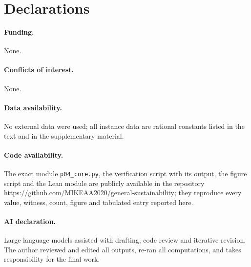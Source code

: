 \section*{Declarations}
\paragraph{Funding.} None.
\paragraph{Conflicts of interest.} None.
\paragraph{Data availability.} No external data were used; all instance data are rational constants listed in the text and in the supplementary material.
\paragraph{Code availability.} The exact module \texttt{p04\_core.py}, the verification script with its output, the figure script and the Lean module are publicly available in the repository \url{https://github.com/MIKEAA2020/general-sustainability}; they reproduce every value, witness, count, figure and tabulated entry reported here.
\paragraph{AI declaration.} Large language models assisted with drafting, code review and iterative revision. The author reviewed and edited all outputs, re-ran all computations, and takes responsibility for the final work.

